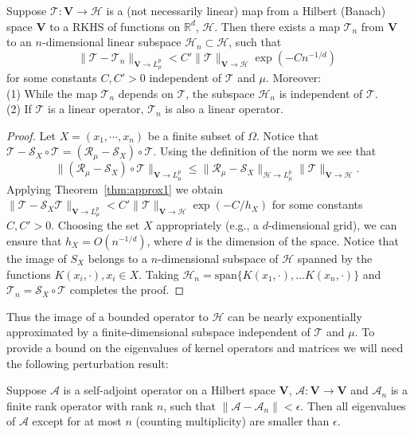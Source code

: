 \documentclass[final,12pt]{colt2018}
\renewcommand{\H}{\mathcal{H}}
\newcommand{\I}{\mathcal{R_{\mu}}}
\newcommand{\A}{\mathcal{A}}
\newcommand{\T}{\mathcal{T}}
\newcommand{\LpL}{{L^p_\mu}}
\renewcommand{\S}{{\mathcal S}}
\newcommand{\bV}{\mathbf{V}}
\newcommand{\R}{\mathbb{R}}
\begin{document}
\begin{theorem}
\label{thm:approx}
Suppose $\T:\bV \to \H$ is a (not necessarily linear) map from a Hilbert (Banach) space $\bV$ to a RKHS of functions on $\R^d$, $\H$. Then there exists a map $\T_n$ from $\bV$ to an $n$-dimensional linear subspace $\H_n\subset \H$, such that  
$$
\|\T - \T_n \|_{\bV \to \LpL} < C' \|\T\|_{\bV \to \H} \exp(-C n^{-1/d})
$$ for some constants $C,C'>0$ independent of $\T$ and $\mu$. Moreover:\\ (1) While the map $\T_n$ depends on $\T$, the subspace  $\H_n$ is independent of $\T$.\\ (2) If $\T$ is a linear operator, $\T_n$ is also  a linear operator. 
\end{theorem} 
\begin{proof} 
Let $X=(x_1,\cdots, x_n)$ be a finite subset of $\Omega$. Notice that $\T - \S_X \circ \T = (\I - \S_X) \circ \T$. 
Using the definition of the norm we see that 
$$\| (\I - \S_X) \circ \T \|_{\bV \to \LpL} \le \|\I - \S_X\|_{\H \to \LpL} \| \T\|_{\bV \to \H}.$$
Applying  Theorem~\ref{thm:approx1} we obtain
$
\|\T - \S_X \T\|_{\bV \to \LpL} < C' \|\T\|_{\bV \to \H} \exp(-C/h_X)
$ for some constants $C,C'>0$. 
Choosing the set $X$ appropriately (e.g., a $d$-dimensional grid), we can ensure that $h_X = O(n^{-1/d})$, where $d$ is the dimension of the space. 
Notice that the image of $S_X$ belongs to a $n$-dimensional subspace of $\H$ spanned by the functions  $K(x_i,\cdot), x_i \in X$. Taking $\H_n = \mathrm{span}\{K(x_1,\cdot),\ldots K(x_n,\cdot)\}$ and $\T_n= \S_X \circ \T$ completes the proof. 
\end{proof}
Thus the image of a bounded operator to $\H$ can be nearly exponentially approximated by a finite-dimensional subspace independent of $\T$ and $\mu$.  
To provide a bound on the eigenvalues of kernel operators and matrices we will  need the following perturbation result:
\begin{lemma}
\label{lemma:low_rank}
Suppose $\A$ is a self-adjoint  operator on a Hilbert space $\bV$,  $\A:\bV \to \bV$ and $\A_n$ is a finite rank operator with rank $n$, such that 
$
\|\A-\A_n\| < \epsilon 
$.
Then all eigenvalues of $\A$ except for at most $n$ (counting multiplicity) are smaller than $\epsilon$. 
\end{lemma} 
\end{document}
